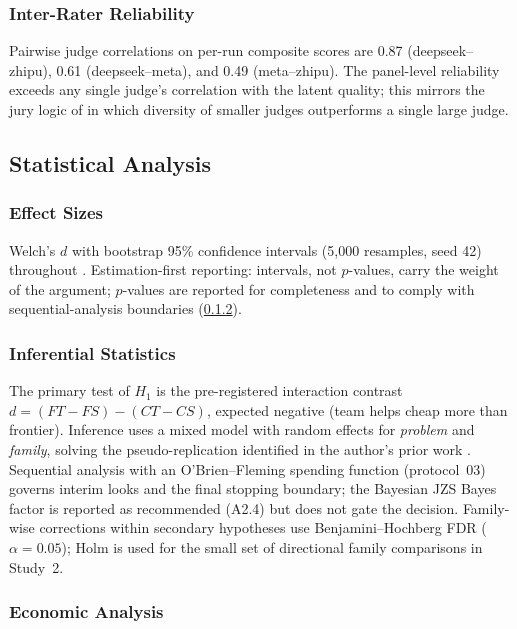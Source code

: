 \documentclass[12pt,a4paper]{article}
\begin{document}
\subsubsection{Inter-Rater Reliability}

Pairwise judge correlations on per-run composite scores are 0.87
(deepseek--zhipu), 0.61 (deepseek--meta), and 0.49 (meta--zhipu). The
panel-level reliability exceeds any single judge's correlation with the latent
quality; this mirrors the jury logic of \citet{VergaEtAl2024} in which diversity
of smaller judges outperforms a single large judge.

\subsection{Statistical Analysis}

\subsubsection{Effect Sizes}

Welch's $d$ with bootstrap 95\% confidence intervals (5{,}000 resamples, seed
42) throughout \citep{Lakens2013}. Estimation-first reporting: intervals, not
$p$-values, carry the weight of the argument; $p$-values are reported for
completeness and to comply with sequential-analysis boundaries
(\cref{sec:inferential}).

\subsubsection{Inferential Statistics}\label{sec:inferential}

The primary test of $H_1$ is the pre-registered interaction contrast
$d = (FT - FS) - (CT - CS)$, expected negative (team helps cheap more than
frontier). Inference uses a mixed model with random effects for \emph{problem}
and \emph{family}, solving the pseudo-replication identified in the author's
prior work \citep{Hariri2026b}. Sequential analysis with an O'Brien--Fleming
spending function (protocol~03) governs interim looks and the final stopping
boundary; the Bayesian JZS Bayes factor is reported as recommended (A2.4) but
does not gate the decision. Family-wise corrections within secondary hypotheses
use Benjamini--Hochberg FDR ($\alpha = 0.05$); Holm is used for the small set of
directional family comparisons in Study~2.

\subsubsection{Economic Analysis}
\end{document}
